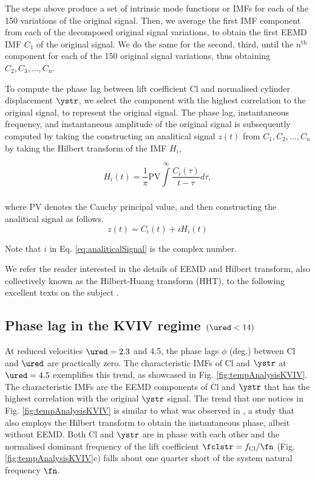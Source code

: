 \documentclass[a4paper,fleqn]{cas-sc}
\begin{document}
The steps above produce a set of intrinsic mode functions or IMFs for each of the 150 variations of the original signal. Then, we average the first IMF component from each of the decomposed original signal variations, to obtain the first EEMD IMF $C_{1}$ of the original signal. We do the same for the second, third, until the $n^{\text{th}}$ component for each of the 150 original signal variations, thus obtaining $C_{2},C_{3},\dots,C_{n}$.

To compute the phase lag between lift coefficient Cl and normalised cylinder displacement  $\ystr$, we select the component with the highest correlation to the original signal, to represent the original signal. The phase lag, instantaneous frequency, and instantaneous amplitude of the original signal is subsequently computed by taking the constructing an analitical signal $z \left( t \right)$ from $C_{1},C_{2},\dots,C_{n}$ by taking the Hilbert transform of the IMF $H_{i}$,

\begin{equation}
  H_{i} \left( t \right) = \frac{1}{\pi} \text{PV} \int\limits_{}^{\infty} \frac{C_{i} \left( \tau \right)}{t - \tau} d\tau,
  \label{eq:hilbertTransform}
\end{equation}

\noindent where PV denotes the Cauchy principal value, and then constructing the analitical signal as follows.
\begin{equation}
  z \left( t \right) = C_{i} \left( t \right) + i H_{i} \left( t \right)
  \label{eq:analiticalSignal}
\end{equation}

\noindent Note that $i$ in Eq. \ref{eq:analiticalSignal} is the complex number.

We refer the reader interested in the details of EEMD and Hilbert transform, also collectively known as the Hilbert-Huang transform (HHT), to the following excellent texts on the subject \citep{Huang2005,Huang2014}.
\subsection{Phase lag in the KVIV regime $\left ( \ured < 14 \right )$} \label{ssec:phaseLag}
At reduced velocities  $\ured = 2.3$ and 4.5, the phase lags  $\phi$ (deg.) between Cl and  $\ured$ are practically zero. The characteristic IMFs of Cl and  $\ystr$ at $\ured = 4.5$ exemplifies this trend, as showcased in Fig. \ref{fig:tempAnalysisKVIV}. The characteristic IMFs are the EEMD components of Cl and  $\ystr$ that has the highest correlation with the original $\ystr$ signal. The trend that one notices in Fig. \ref{fig:tempAnalysisKVIV} is similar to what was observed in \citet{Khalak1999}, a study that also employs the Hilbert transform to obtain the instantaneous phase, albeit without EEMD. Both Cl and  $\ystr$ are in phase with each other and the normalised dominant frequency of the lift coefficient $\fclstr = f_{\text{Cl}}/\fn$ (Fig. \ref{fig:tempAnalysisKVIV}c) falls about one quarter short of the system natural frequency  $\fn$.
\end{document}
